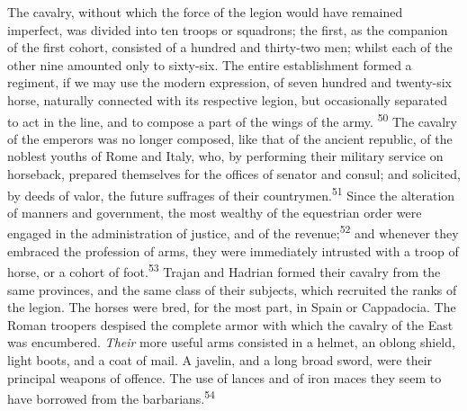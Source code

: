 The cavalry, without which the force of the legion would have
remained imperfect, was divided into ten troops or squadrons; the
first, as the companion of the first cohort, consisted of a
hundred and thirty-two men; whilst each of the other nine
amounted only to sixty-six. The entire establishment formed a
regiment, if we may use the modern expression, of seven hundred
and twenty-six horse, naturally connected with its respective
legion, but occasionally separated to act in the line, and to
compose a part of the wings of the army. \textsuperscript{50} The cavalry of the
emperors was no longer composed, like that of the ancient
republic, of the noblest youths of Rome and Italy, who, by
performing their military service on horseback, prepared
themselves for the offices of senator and consul; and solicited,
by deeds of valor, the future suffrages of their countrymen.\textsuperscript{51}
Since the alteration of manners and government, the most wealthy
of the equestrian order were engaged in the administration of
justice, and of the revenue;\textsuperscript{52} and whenever they embraced the
profession of arms, they were immediately intrusted with a troop
of horse, or a cohort of foot.\textsuperscript{53} Trajan and Hadrian formed their
cavalry from the same provinces, and the same class of their
subjects, which recruited the ranks of the legion. The horses
were bred, for the most part, in Spain or Cappadocia. The Roman
troopers despised the complete armor with which the cavalry of
the East was encumbered. \textit{Their} more useful arms consisted in a
helmet, an oblong shield, light boots, and a coat of mail. A
javelin, and a long broad sword, were their principal weapons of
offence. The use of lances and of iron maces they seem to have
borrowed from the barbarians.\textsuperscript{54}




